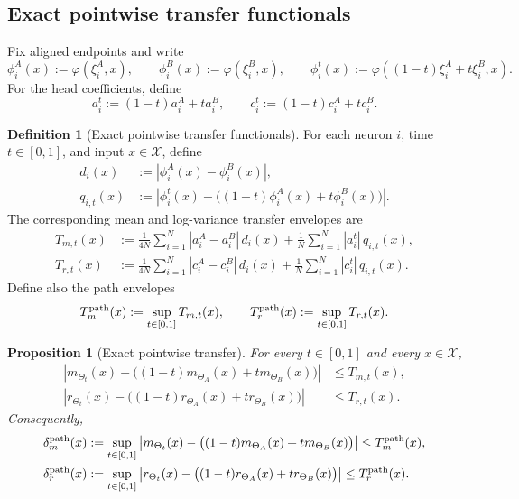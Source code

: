 \documentclass[11pt]{article}
\newtheorem{proposition}[theorem]{Proposition}
\theoremstyle{definition}
\newtheorem{definition}[theorem]{Definition}
\newcommand{\abs}[1]{\left\lvert #1 \right\rvert}
\newcommand{\mc}[1]{\mathcal{#1}}
\begin{document}
\subsection{Exact pointwise transfer functionals}

Fix aligned endpoints and write
\[
  \phi_i^A(x):=\varphi(\xi_i^A,x),
  \qquad
  \phi_i^B(x):=\varphi(\xi_i^B,x),
  \qquad
  \phi_i^t(x):=\varphi((1-t)\xi_i^A+t\xi_i^B,x).
\]
For the head coefficients, define
\[
  a_i^t:=(1-t)a_i^A+t a_i^B,
  \qquad
  c_i^t:=(1-t)c_i^A+t c_i^B.
\]

\begin{definition}[Exact pointwise transfer functionals]
\label{def:exact-gaussian-transfer}
For each neuron $i$, time $t\in[0,1]$, and input $x\in\mc{X}$, define
\begin{align}
  d_i(x)
  &:=
  \abs{\phi_i^A(x)-\phi_i^B(x)},
  \label{eq:exact-di-gaussian}
  \\
  q_{i,t}(x)
  &:=
  \abs{\phi_i^t(x)-\bigl((1-t)\phi_i^A(x)+t\phi_i^B(x)\bigr)}.
  \label{eq:exact-qi-gaussian}
\end{align}
The corresponding mean and log-variance transfer envelopes are
\begin{align}
  T_{m,t}(x)
  &:=
  \frac{1}{4N}\sum_{i=1}^N \abs{a_i^A-a_i^B}\,d_i(x)
  +
  \frac{1}{N}\sum_{i=1}^N \abs{a_i^t}\,q_{i,t}(x),
  \label{eq:Tm-t}
  \\
  T_{r,t}(x)
  &:=
  \frac{1}{4N}\sum_{i=1}^N \abs{c_i^A-c_i^B}\,d_i(x)
  +
  \frac{1}{N}\sum_{i=1}^N \abs{c_i^t}\,q_{i,t}(x).
  \label{eq:Tr-t}
\end{align}
Define also the path envelopes
\begin{equation}
  T_m^{\rm path}(x):=\sup_{t\in[0,1]} T_{m,t}(x),
  \qquad
  T_r^{\rm path}(x):=\sup_{t\in[0,1]} T_{r,t}(x).
  \label{eq:T-path}
\end{equation}
\end{definition}

\begin{proposition}[Exact pointwise transfer]
\label{prop:exact-gaussian-transfer}
For every $t\in[0,1]$ and every $x\in\mc{X}$,
\begin{align}
  \abs{m_{\Theta_t}(x)-\bigl((1-t)m_{\Theta_A}(x)+t m_{\Theta_B}(x)\bigr)}
  &\le
  T_{m,t}(x),
  \label{eq:exact-transfer-m}
  \\
  \abs{r_{\Theta_t}(x)-\bigl((1-t)r_{\Theta_A}(x)+t r_{\Theta_B}(x)\bigr)}
  &\le
  T_{r,t}(x).
  \label{eq:exact-transfer-r}
\end{align}
Consequently,
\begin{align}
  \delta_m^{\rm path}(x)
  &:=
  \sup_{t\in[0,1]}
  \abs{m_{\Theta_t}(x)-\bigl((1-t)m_{\Theta_A}(x)+t m_{\Theta_B}(x)\bigr)}
  \le
  T_m^{\rm path}(x),
  \label{eq:delta-m-path}
  \\
  \delta_r^{\rm path}(x)
  &:=
  \sup_{t\in[0,1]}
  \abs{r_{\Theta_t}(x)-\bigl((1-t)r_{\Theta_A}(x)+t r_{\Theta_B}(x)\bigr)}
  \le
  T_r^{\rm path}(x).
  \label{eq:delta-r-path}
\end{align}
\end{proposition}
\end{document}

